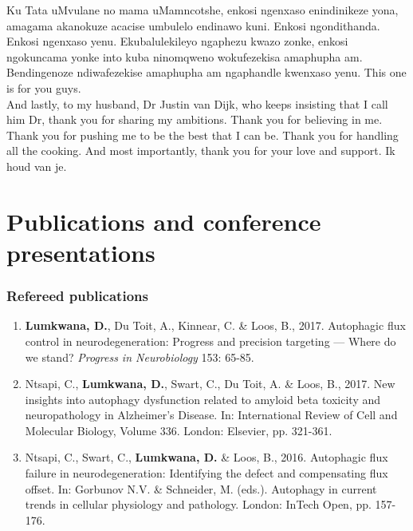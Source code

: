 \noindent
Ku Tata uMvulane no mama uMamncotshe, enkosi ngenxaso enindinikeze yona, amagama akanokuze acacise umbulelo endinawo kuni. Enkosi ngondithanda. Enkosi ngenxaso yenu. Ekubalulekileyo ngaphezu kwazo zonke, enkosi ngokuncama yonke into kuba ninomqweno wokufezekisa amaphupha am. Bendingenoze ndiwafezekise amaphupha am ngaphandle kwenxaso yenu. This one is for you guys.\\

\noindent
And lastly, to my husband, Dr Justin van Dijk, who keeps insisting that I call him Dr, thank you for sharing my ambitions. Thank you for believing in me. Thank you for pushing me to be the best that I can be. Thank you for handling all the cooking. And most importantly, thank you for your love and support. Ik houd van je.

\chapter{Publications and conference presentations}

\subsection*{Refereed publications}
\begin{enumerate}
\item \textbf{Lumkwana, D.}, Du Toit, A., Kinnear, C. \& Loos, B., 2017. Autophagic flux control in neurodegeneration: Progress and precision targeting — Where do we stand? \textit{Progress in Neurobiology} 153: 65-85.
\item Ntsapi, C., \textbf{Lumkwana, D.}, Swart, C., Du Toit, A. \& Loos, B., 2017. New insights into autophagy dysfunction related to amyloid beta toxicity and neuropathology in Alzheimer’s Disease. In: International Review of Cell and Molecular Biology, Volume 336. London: Elsevier, pp. 321-361.
\item Ntsapi, C., Swart, C., \textbf{Lumkwana, D.} \& Loos, B., 2016. Autophagic flux failure in neurodegeneration: Identifying the defect and compensating flux offset. In: Gorbunov N.V. \& Schneider, M. (eds.). Autophagy in current trends in cellular physiology and pathology. London: InTech Open, pp. 157-176.
\end{enumerate}

